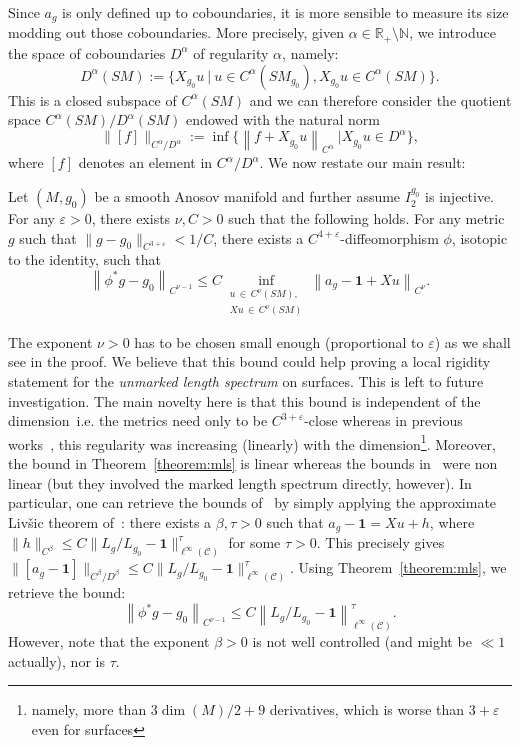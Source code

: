 \documentclass[AHL,Unicode,longabstracts,published]{cedram}
\newcommand{\R}{\mathbb{R}}
\newcommand{\N}{\mathbb{N}}
\newcommand{\bfun}{\mathbf{1}}
\newcommand{\eps}{\varepsilon}
\newcommand{\mc}{\mathcal}
\begin{document}
Since $a_g$ is only defined up to coboundaries, it is more sensible to measure its size modding out those coboundaries. More precisely, given $\alpha \in \R_+ \setminus \N$, we introduce the space of coboundaries $D^\alpha$ of regularity $\alpha$, namely:
\[
D^\alpha(SM) := \Big\{ X_{g_0} u~\Big|~u \in C^\alpha(SM_{g_0}), X_{g_0} u \in C^\alpha(SM) \Big\}.
\]
This is a closed subspace of $C^\alpha(SM)$ and we can therefore consider the quotient space $C^\alpha(SM)/D^\alpha(SM)$ endowed with the natural norm
\[
\|[f]\|_{C^\alpha/D^\alpha} := \inf\Big\{\left\|f + X_{g_0}u\right\|_{C^\alpha}\ \Big| X_{g_0} u \in D^\alpha \Big\},
\]
where $[f]$ denotes an element in $C^\alpha/D^\alpha$. We now restate our main result:

\begin{theo}\label{theorem:mlsx}
Let $(M,g_0)$ be a smooth Anosov manifold and further assume $I^{g_0}_2$ is injective. For any $\eps>0$, there exists $\nu, C > 0$ such that the following holds. For any metric $g$ such that $\|g-g_0\|_{C^{3+\eps}} < 1/C$, there exists a $C^{4+\eps}$-diffeomorphism $\phi$, isotopic to the identity, such that
\[
\left\| \phi^* g - g_0\right\|_{C^{\nu-1}} \leq C \inf_{\substack{u\,\in\,C^\nu(SM), \\
Xu\,\in\,C^\nu(SM)}} \left\|a_g-\bfun + Xu\right\|_{C^{\nu}}.
\]
\end{theo}

The exponent $\nu > 0$ has to be chosen small enough (proportional to $\eps$) as we shall see in the proof. We believe that this bound could help proving a local rigidity statement for the \emph{unmarked length spectrum} on surfaces. This is left to future investigation. The main novelty here is that this bound is independent of the dimension~i.e. the metrics need only to be $C^{3+\eps}$-close whereas in previous works~\cite{Guillarmou-Knieper-Lefeuvre-19,Guillarmou-Lefeuvre-18}, this regularity was increasing (linearly) with the dimension\footnote{namely, more than $3\dim(M)/2 + 9$ derivatives, which is worse than $3+\eps$ even for surfaces}. Moreover, the bound in Theorem~\ref{theorem:mls} is linear whereas the bounds in~\cite{Guillarmou-Knieper-Lefeuvre-19,Guillarmou-Lefeuvre-18} were non linear (but they involved the marked length spectrum directly, however). In particular, one can retrieve the bounds of~\cite{Guillarmou-Knieper-Lefeuvre-19,Guillarmou-Lefeuvre-18} by simply applying the approximate Liv{\v s}ic theorem of~\cite{Gouezel-Lefeuvre-19}: there exists a $\beta,\tau > 0$ such that $a_g-\bfun = Xu + h$, where $\|h\|_{C^\beta} \leq C \|L_g/L_{g_0}-\bfun\|_{\ell^\infty(\mc{C})}^\tau$ for some $\tau>0$. This precisely gives $\|[a_g-\bfun]\|_{C^\beta/D^\beta} \leq C \|L_g/L_{g_0}-\bfun\|_{\ell^\infty(\mc{C})}^\tau$. Using Theorem~\ref{theorem:mls}, we retrieve the bound:
\[
\left\| \phi^* g - g_0\right\|_{C^{\nu-1}} \leq C \left\|L_g/L_{g_0}-\bfun\right\|_{\ell^\infty(\mc{C})}^\tau.
\]
However, note that the exponent $\beta > 0$ is not well controlled (and might be $\ll 1$ actually), nor is $\tau$.
\end{document}
